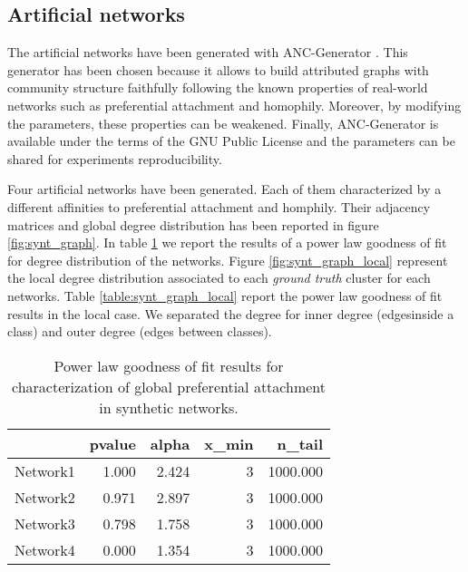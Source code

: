 \documentclass[a4paper, 12pt]{article}
\begin{document}
\subsection{Artificial networks}

The artificial networks have been generated with ANC-Generator \cite{largeron2015}. This generator has been chosen because it allows to build attributed graphs with  community structure faithfully following the known properties of real-world networks such as preferential attachment and homophily.
Moreover, by modifying the parameters, these properties can be weakened. Finally, ANC-Generator is available under the terms of the GNU Public License and the        parameters can be shared for experiments reproducibility.

Four artificial networks have been generated. Each of them characterized by a different affinities to preferential attachment and homphily. Their adjacency matrices and global degree distribution has been reported in figure \ref{fig:synt_graph}. In table \ref{table:synt_graph} we report the results of a power law goodness of fit for degree distribution of the networks. Figure \ref{fig:synt_graph_local} represent the local degree distribution associated to each \emph{ground truth} cluster for each networks. Table \ref{table:synt_graph_local} report the power law goodness of fit results in the local case. We separated the degree for inner degree (edgesinside a class) and outer degree (edges between classes).





\begin{table}[h]
\caption{Power law goodness of fit results for characterization of global preferential attachment in synthetic networks.}
\centering
    \begin{tabular}{lrrrr}
    \hline
               &   pvalue &   alpha &   x\_min &   n\_tail \\
    \hline
     Network1 &    1.000 &   2.424 &       3 & 1000.000 \\
     Network2 &    0.971 &   2.897 &       3 & 1000.000 \\
     Network3 &    0.798 &   1.758 &       3 & 1000.000 \\
     Network4 &    0.000 &   1.354 &       3 & 1000.000 \\
    \hline
    \end{tabular}
\label{table:synt_graph}
\end{table}
\end{document}
